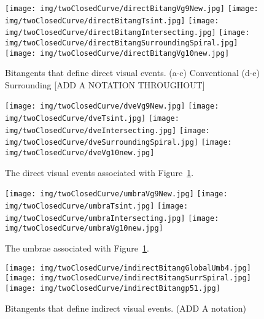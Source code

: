 \documentclass[12pt]{article}
\begin{document}
%
\begin{figure}[h]
\begin{center}
\texttt{[image: img/twoClosedCurve/directBitangVg9New.jpg]}
\texttt{[image: img/twoClosedCurve/directBitangTsint.jpg]}
\texttt{[image: img/twoClosedCurve/directBitangIntersecting.jpg]}
\texttt{[image: img/twoClosedCurve/directBitangSurroundingSpiral.jpg]}
\texttt{[image: img/twoClosedCurve/directBitangVg10new.jpg]}
\end{center}
\caption{Bitangents that define direct visual events.  
         (a-c) Conventional (d-e) Surrounding [ADD A NOTATION THROUGHOUT]}
\label{fig:directve}
\end{figure}

\begin{figure}[h]
\begin{center}
\texttt{[image: img/twoClosedCurve/dveVg9New.jpg]}
\texttt{[image: img/twoClosedCurve/dveTsint.jpg]}
\texttt{[image: img/twoClosedCurve/dveIntersecting.jpg]}
\texttt{[image: img/twoClosedCurve/dveSurroundingSpiral.jpg]}
\texttt{[image: img/twoClosedCurve/dveVg10new.jpg]}
\end{center}
\caption{The direct visual events associated with Figure~\ref{fig:directve}.}
\label{fig:dve}
\end{figure}


\begin{figure}
\begin{center}
\texttt{[image: img/twoClosedCurve/umbraVg9New.jpg]}
\texttt{[image: img/twoClosedCurve/umbraTsint.jpg]}
\texttt{[image: img/twoClosedCurve/umbraIntersecting.jpg]}
\texttt{[image: img/twoClosedCurve/umbraVg10new.jpg]}
\end{center}
\caption{The umbrae associated with Figure~\ref{fig:directve}.}
\label{fig:directumbrae}
\end{figure}

%
\begin{figure}[h]
\begin{center}
\texttt{[image: img/twoClosedCurve/indirectBitangGlobalUmb4.jpg]}
\texttt{[image: img/twoClosedCurve/indirectBitangSurrSpiral.jpg]}
\texttt{[image: img/twoClosedCurve/indirectBitangp51.jpg]}
\end{center}
\caption{Bitangents that define indirect visual events. (ADD A notation)}
\label{fig:indirectve}
\end{figure}
\end{document}
